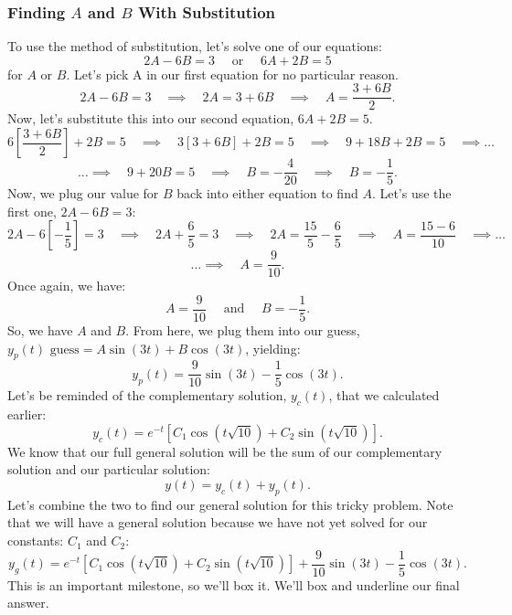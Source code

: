 \documentclass[a4paper,12pt]{article} %
\begin{document}
\subsubsection*{Finding $A$ and $B$ With Substitution}
To use the method of substitution, let's solve one of our equations:
$$ 2A - 6B = 3 \quad \text{ or } \quad 6A + 2B = 5 $$
for $A$ or $B$. Let's pick A in our first equation for no particular reason.
$$ 2A - 6B = 3 \quad\implies \quad 2A = 3 + 6B \quad\implies \quad A = \frac{3 + 6B}{2}.$$
Now, let's substitute this into our second equation, $6A + 2B = 5.$
$$ 6\left[\frac{3 + 6B}{2}\right] + 2B = 5 \quad\implies \quad 3[3 + 6B] + 2B = 5 \quad\implies \quad 9 + 18B + 2B = 5 \quad\implies \ldots $$
$$ \ldots\implies \quad 9 + 20B = 5 \quad\implies \quad B = -\frac{4}{20} \quad\implies\quad B = -\frac{1}{5}. $$
Now, we plug our value for $B$ back into either equation to find $A$. Let's use the first one, $2A - 6B = 3$:
$$ 2A - 6\left[-\frac{1}{5}\right] = 3 \quad\implies \quad 2A + \frac{6}{5} = 3 \quad\implies \quad 2A = \frac{15}{5} - \frac{6}{5} \quad\implies \quad A = \frac{15 - 6}{10} \quad\implies\ldots$$
$$\ldots\implies \quad A = \frac{9}{10}. $$
Once again, we have:
$$  A = \frac{9}{10} \quad\text{ and }\quad B = -\frac{1}{5}. $$
So, we have $A$ and $B$. From here, we plug them into our guess, $y_p(t) \text{ guess} = A\sin(3t) + B\cos(3t)$, yielding:
$$ \boxed{y_p(t) = \frac{9}{10}\sin{(3t)} - \frac{1}{5}\cos{(3t).}} $$
Let's be reminded of the complementary solution, $y_c(t)$, that we calculated earlier:
$$  y_c(t) = e^{-t}\left[C_1\cos{\left(t\sqrt{10}\right)} + C_2\sin{\left(t\sqrt{10}\right)}\right].$$
We know that our full general solution will be the sum of our complementary solution and our particular solution:
$$ y(t) = y_c(t) + y_p(t). $$
Let's combine the two to find our general solution for this tricky problem. Note that we will have a general solution because we have not yet solved for our constants: $C_1$ and $C_2$:
$$ \boxed{y_g(t) = e^{-t}\left[C_1\cos{\left(t\sqrt{10}\right)} + C_2\sin{\left(t\sqrt{10}\right)}\right] +  \frac{9}{10}\sin{(3t)} -  \frac{1}{5}\cos{(3t).}} $$
This is an important milestone, so we'll box it. We'll box and underline our final answer. \\
\end{document}
